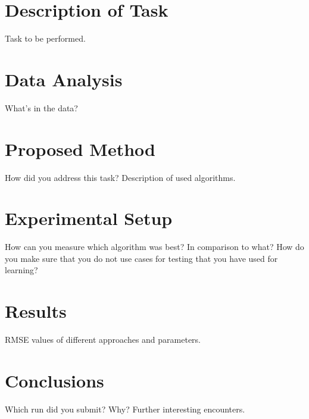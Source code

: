 \documentclass{sigish}
\begin{document}
\section{Description of Task \taskno}

Task to be performed.

\section{Data Analysis}

What's in the data?


\section{Proposed Method}

How did you address this task?
Description of used algorithms.

\section{Experimental Setup}

How can you measure which algorithm was best? In comparison to what? How do you make sure that you do not use cases for testing that you have used for learning?


\section{Results}

RMSE values of different approaches and parameters.


\section{Conclusions}

Which run did you submit? Why?
Further interesting encounters.



\end{document}

